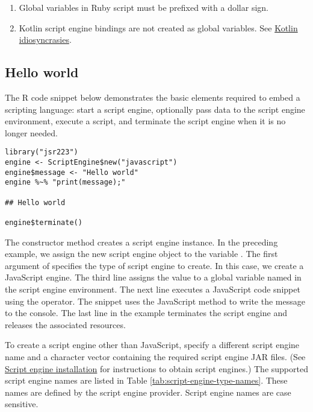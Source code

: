\begin{enumerate}
\item Global variables in Ruby script must be prefixed with a dollar sign.
\item Kotlin script engine bindings are not created as global variables. See \hyperlink{kotlinidiosyncrasies}{Kotlin idiosyncrasies}.
\end{enumerate}

\subsection{Hello world}

The R code snippet below demonstrates the basic elements required to embed a scripting language: start a script engine, optionally pass data to the script engine environment, execute a script, and terminate the script engine when it is no longer needed.

\begin{verbatim}
library("jsr223")
engine <- ScriptEngine$new("javascript")
engine$message <- "Hello world"
engine %~% "print(message);"

## Hello world

engine$terminate()
\end{verbatim}

The  constructor method creates a script engine instance. In the preceding example, we assign the new script engine object to the variable . The first argument of  specifies the type of script engine to create. In this case, we create a JavaScript engine. The third line assigns the value  to a global variable named  in the script engine environment. The next line executes a JavaScript code snippet using the \code{\%$\sim$\%} operator. The snippet uses the JavaScript  method to write the message to the console. The last line in the example terminates the script engine and releases the associated resources.

To create a script engine other than JavaScript, specify a different script engine name and a character vector containing the required script engine JAR files. (See \hyperlink{scriptengineinstallation}{Script engine installation} for instructions to obtain script engines.) The supported script engine names are listed in Table \ref{tab:script-engine-type-names}. These names are defined by the script engine provider.  Script engine names are case sensitive.

